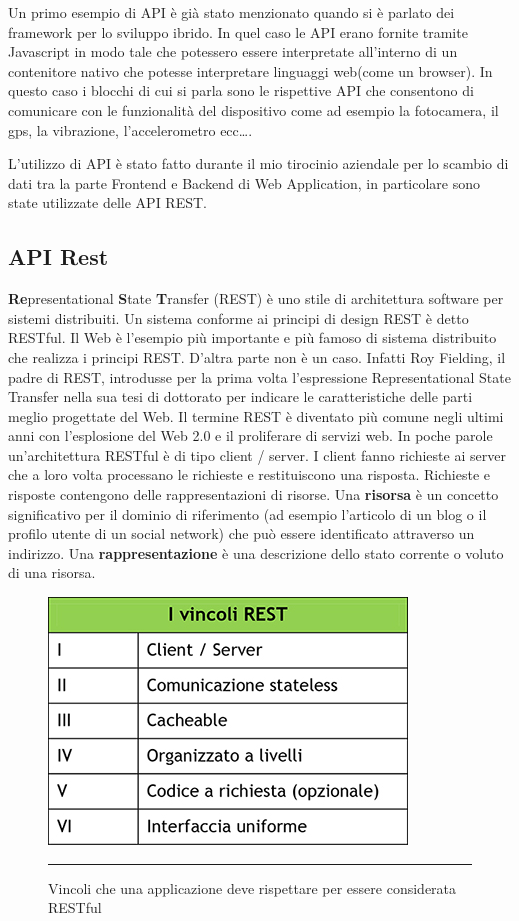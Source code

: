 Un primo esempio di API è già stato menzionato quando si è parlato dei framework per lo sviluppo ibrido. In quel caso le API erano fornite tramite Javascript in modo tale che potessero essere interpretate all'interno di un contenitore nativo che potesse interpretare linguaggi web(come un browser). In questo caso i blocchi di cui si parla sono le rispettive API che consentono di comunicare con le funzionalità del dispositivo come ad esempio la fotocamera, il gps, la vibrazione, l'accelerometro ecc\ldots.

L'utilizzo di API è stato fatto durante il mio tirocinio aziendale per lo scambio di dati tra la parte Frontend e Backend di Web Application, in particolare sono state utilizzate delle API REST.

\subsection{API Rest}

\textbf{Re}presentational \textbf{S}tate \textbf{T}ransfer (REST) è uno stile di architettura software per sistemi distribuiti. Un sistema conforme ai principi di design REST è detto RESTful. Il Web è l'esempio più importante e più famoso di sistema distribuito che realizza i principi REST. D'altra parte non è un caso. Infatti Roy Fielding, il padre di REST, introdusse per la prima volta l'espressione Representational State Transfer nella sua tesi di dottorato per indicare le caratteristiche delle parti meglio progettate del Web.
Il termine REST è diventato più comune negli ultimi anni con l'esplosione del Web 2.0 e il proliferare di servizi web.
In poche parole un'architettura RESTful è di tipo client / server. I client fanno richieste ai server che a loro volta processano le richieste e restituiscono una risposta. Richieste e risposte contengono delle rappresentazioni di risorse. Una \textbf{risorsa} è un concetto significativo per il dominio di riferimento (ad esempio l'articolo di un blog o il profilo utente di un social network) che può essere identificato attraverso un indirizzo. Una \textbf{rappresentazione} è una descrizione dello stato corrente o voluto di una risorsa.

\begin{figure}[htbp]
  \centering
    \includegraphics[scale=0.75]{Figures/tab-rest.jpg} 
    \rule{35em}{0.5pt}
  \caption[Vincoli REST]{Vincoli che una applicazione deve rispettare per essere considerata RESTful}
  \label{fig:REST Rules}
\end{figure}

